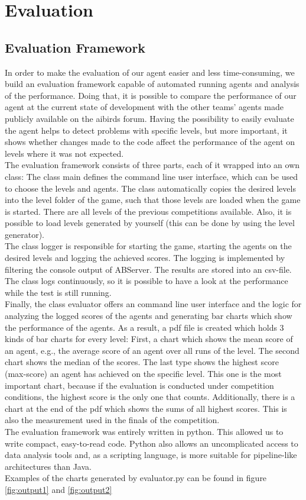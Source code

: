 \section{Evaluation}\label{ch:evaluation}

\subsection{Evaluation Framework}
In order to make the evaluation of our agent easier and less time-consuming, we build an evaluation framework capable of automated running agents and analysis of the performance. Doing that, it is possible to compare the performance of our agent at the current state of development with the other teams' agents made publicly available on the aibirds forum. Having the possibility to easily evaluate the agent helps to detect problems with specific levels, but more important, it shows whether changes made to the code affect the performance of the agent on levels where it was not expected. \\
The evaluation framework consists of three parts, each of it wrapped into an own class: The class main defines the command line user interface, which can be used to choose the levels and agents. The class automatically copies the desired levels into the level folder of the game, such that those levels are loaded when the game is started. There are all levels of the previous competitions available. Also, it is possible to load levels generated by yourself (this can be done by using the level generator). \\
The class logger is responsible for starting the game, starting the agents on the desired levels and logging the achieved scores. The logging is implemented by filtering the console output of ABServer. The results are stored into an csv-file. The class logs continuously, so it is possible to have a look at the performance while the test is still running.\\
Finally, the class evaluator offers an command line user interface and the logic for analyzing the logged scores of the agents and generating bar charts which show the performance of the agents. As a result, a pdf file is created which holds 3 kinds of bar charts for every level: First, a chart which shows the mean score of an agent, e.g., the average score of an agent over all runs of the level. The second chart shows the median of the scores. The last type shows the highest score (max-score) an agent has achieved on the specific level. This one is the most important chart, because if the evaluation is conducted under competition conditions, the highest score is the only one that counts. Additionally, there is a chart at the end of the pdf which shows the sums of all highest scores. This is also the measurement used in the finals of the competition.\\
The evaluation framework was entirely written in python. This allowed us to write compact, easy-to-read code. Python also allows an uncomplicated access to data analysis tools and, as a scripting language, is more suitable for pipeline-like architectures than Java. \\
Examples of the charts generated by evaluator.py can be found in figure \ref{fig:output1} and \ref{fig:output2}

